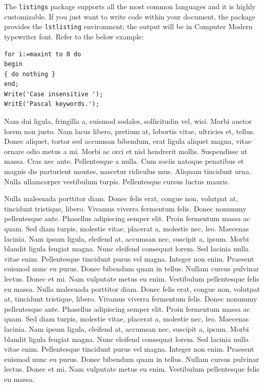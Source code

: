 \documentclass[AMA,Times1COL]{WileyNJDv5} %
\begin{document}
The {\tt listings} package supports all the most common languages and it is highly customizable. If you just want to write code within your document, the package provides the {\tt lstlisting} environment; the output will be in Computer Modern typewriter font. Refer to the below example:


\begin{lstlisting}[caption={Descriptive caption text},label=DescriptiveLabel, basicstyle=\fontsize{8}{10}\selectfont\ttfamily]
for i:=maxint to 0 do
begin
{ do nothing }
end;
Write('Case insensitive ');
WritE('Pascal keywords.');
\end{lstlisting}




Nam dui ligula, fringilla a, euismod sodales, sollicitudin vel, wisi. Morbi auctor lorem non justo. Nam lacus libero,
pretium at, lobortis vitae, ultricies et, tellus. Donec aliquet, tortor sed accumsan bibendum, erat ligula aliquet magna,
vitae ornare odio metus a mi. Morbi ac orci et nisl hendrerit mollis. Suspendisse ut massa. Cras nec ante. Pellentesque
a nulla. Cum sociis natoque penatibus et magnis dis parturient montes, nascetur ridiculus mus. Aliquam tincidunt
urna. Nulla ullamcorper vestibulum turpis. Pellentesque cursus luctus mauris.

Nulla malesuada porttitor diam. Donec felis erat, congue non, volutpat at, tincidunt tristique, libero. Vivamus
viverra fermentum felis. Donec nonummy pellentesque ante. Phasellus adipiscing semper elit. Proin fermentum massa
ac quam. Sed diam turpis, molestie vitae, placerat a, molestie nec, leo. Maecenas lacinia. Nam ipsum ligula, eleifend
at, accumsan nec, suscipit a, ipsum. Morbi blandit ligula feugiat magna. Nunc eleifend consequat lorem. Sed lacinia
nulla vitae enim. Pellentesque tincidunt purus vel magna. Integer non enim. Praesent euismod nunc eu purus. Donec
bibendum quam in tellus. Nullam cursus pulvinar lectus. Donec et mi. Nam vulputate metus eu enim. Vestibulum
pellentesque felis eu massa.
Nulla malesuada porttitor diam. Donec felis erat, congue non, volutpat at, tincidunt tristique, libero. Vivamus
viverra fermentum felis. Donec nonummy pellentesque ante. Phasellus adipiscing semper elit. Proin fermentum massa
ac quam. Sed diam turpis, molestie vitae, placerat a, molestie nec, leo. Maecenas lacinia. Nam ipsum ligula, eleifend
at, accumsan nec, suscipit a, ipsum. Morbi blandit ligula feugiat magna. Nunc eleifend consequat lorem. Sed lacinia
nulla vitae enim. Pellentesque tincidunt purus vel magna. Integer non enim. Praesent euismod nunc eu purus. Donec
bibendum quam in tellus. Nullam cursus pulvinar lectus. Donec et mi. Nam vulputate metus eu enim. Vestibulum
pellentesque felis eu massa.
\end{document}
